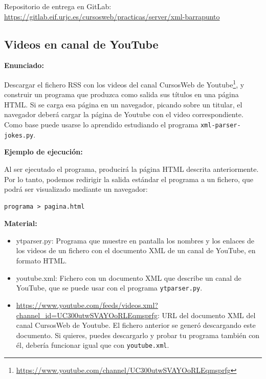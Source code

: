 Repositorio de entrega en GitLab: \\
\url{https://gitlab.eif.urjc.es/cursosweb/practicas/server/xml-barrapunto}


\subsection{Videos en canal de YouTube}
\label{subsec:xml-youtube}

\textbf{Enunciado:}

Descargar el fichero RSS con los videos del canal CursosWeb de Youtube\footnote{\url{https://www.youtube.com/channel/UC300utwSVAYOoRLEqmsprfg}}, y construir un programa que produzca como salida sus títulos en una página HTML. Si se carga esa página en un navegador,  picando sobre un titular, el navegador deberá cargar la página de Youtube con el video correspondiente. Como base puede usarse lo aprendido estudiando el programa \verb|xml-parser-jokes.py|.

\textbf{Ejemplo de ejecución:}

Al ser ejecutado el programa, producirá la página HTML descrita anteriormente. Por lo tanto, podemos redirigir la salida estándar el programa a un fichero, que podrá ser visualizado mediante un navegador:

\begin{verbatim}
programa > pagina.html
\end{verbatim}

\textbf{Material:}

\begin{itemize}
\item ytparser.py: Programa que muestre en pantalla los nombres y los enlaces de los videos de un fichero con el documento XML de un canal de YouTube, en formato HTML.
\item youtube.xml: Fichero con un documento XML que describe un canal de YouTube, que se puede usar con el programa \verb|ytparser.py|.
\item \url{https://www.youtube.com/feeds/videos.xml?channel_id=UC300utwSVAYOoRLEqmsprfg}: URL del documento XML del canal CursosWeb de Youtube. El fichero anterior se generó descargando este documento. Si quieres, puedes descargarlo y probar tu programa también con él, debería funcionar igual que con \verb|youtube.xml|.
\end{itemize}

